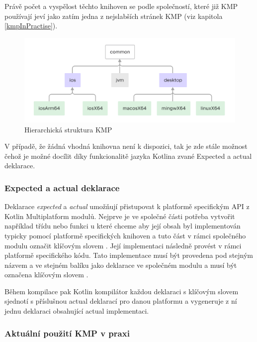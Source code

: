 Právě počet a vyspělost těchto knihoven se podle společností, které již KMP používají jeví jako zatím jedna z nejslabších stránek KMP (viz kapitola \ref{kmpInPractise}).


\begin{figure}[H]
  \centering
  \includegraphics[width=1\textwidth]{kotlin-multiplatform-hierarchical-structure.png}
  \caption{Hierarchická struktura KMP}
  \label{fig:KMP_struktura}
\end{figure}

V případě, že žádná vhodná knihovna není k dispozici, tak je zde stále možnost čehož je možné docílit díky funkcionalitě jazyka Kotlina
zvané Expected a actual deklarace.

\subsubsection*{Expected a actual deklarace}\label{expectActual}
Deklarace \textit{expected} a \textit{actual} umožňují přistupovat k platformě specifickým API z Kotlin Multiplatform modulů. \cite{KMPExpectActual}
Nejprve je ve společné části potřeba vytvořit například třídu nebo funkci u které chceme aby její obsah byl implementován typicky pomocí
platformě specifických knihoven a tuto část v rámci společného modulu označit klíčovým slovem . \cite{KMPExpectActual} Její implementaci následně provést v rámci
platformě specifického kódu. Tato implementace musí být provedena pod stejným názvem a ve stejném balíku jako deklarace ve společném modulu
a musí být označena klíčovým slovem . \cite{KMPExpectActual}

Během kompilace pak Kotlin kompilátor každou deklaraci s klíčovým slovem  sjednotí s příslušnou actual deklarací pro danou platformu
a vygeneruje z ní jednu deklaraci obsahující actual implementaci. \cite{KMPExpectActual}

\subsubsection*{Aktuální použití KMP v praxi} \label{kmpInPractise}

